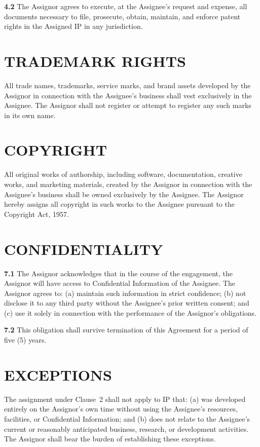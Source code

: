 \documentclass[10pt]{article}
\begin{document}
\textbf{4.2} The Assignor agrees to execute, at the Assignee's request and expense, all documents necessary to file, prosecute, obtain, maintain, and enforce patent rights in the Assigned IP in any jurisdiction.

\section{TRADEMARK RIGHTS}

All trade names, trademarks, service marks, and brand assets developed by the Assignor in connection with the Assignee's business shall vest exclusively in the Assignee. The Assignor shall not register or attempt to register any such marks in its own name.

\section{COPYRIGHT}

All original works of authorship, including software, documentation, creative works, and marketing materials, created by the Assignor in connection with the Assignee's business shall be owned exclusively by the Assignee. The Assignor hereby assigns all copyright in such works to the Assignee pursuant to the Copyright Act, 1957.

\section{CONFIDENTIALITY}

\textbf{7.1} The Assignor acknowledges that in the course of the engagement, the Assignor will have access to Confidential Information of the Assignee. The Assignor agrees to: (a) maintain such information in strict confidence; (b) not disclose it to any third party without the Assignee's prior written consent; and (c) use it solely in connection with the performance of the Assignor's obligations.

\textbf{7.2} This obligation shall survive termination of this Agreement for a period of five (5) years.

\section{EXCEPTIONS}

The assignment under Clause~2 shall not apply to IP that: (a) was developed entirely on the Assignor's own time without using the Assignee's resources, facilities, or Confidential Information; and (b) does not relate to the Assignee's current or reasonably anticipated business, research, or development activities. The Assignor shall bear the burden of establishing these exceptions.
\end{document}
